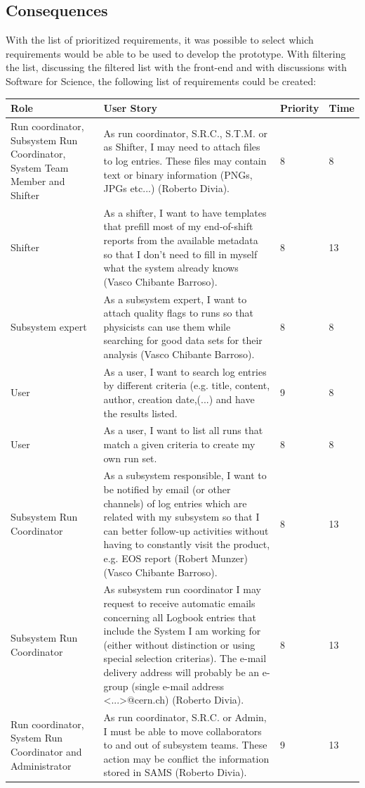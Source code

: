 \documentclass[paper=a4, fontsize=11pt,twoside]{scrartcl}	%
\begin{document}
\subsection{Consequences}
With the list of prioritized requirements, it was possible to select which requirements would be able to be used to develop the prototype. With filtering the list, discussing the filtered list with the front-end and with discussions with Software for Science, the following list of requirements could be created: \\
\begin{longtable}{ | p{3cm} | p{8cm} | p{1.5cm} | l |}
\hline
Role & User Story & Priority & Time \\ \hline
Run coordinator, Subsystem Run Coordinator, System Team Member and Shifter& As run coordinator, S.R.C., S.T.M. or as Shifter, I may need to attach files to log entries. These files may contain text or binary information (PNGs, JPGs etc...) (Roberto Divia). & 8 & 8 \\ \hline
Shifter &  As a shifter, I want to have templates that prefill most of my end-of-shift reports from the available metadata so that I don’t need to fill in myself what the system already knows (Vasco Chibante Barroso). & 8 & 13 \\ \hline
Subsystem expert & As a subsystem expert, I want to attach quality flags to runs so that
physicists can use them while searching for good data sets for their analysis (Vasco Chibante Barroso). & 8 & 8 \\ \hline
User & As a user, I want to search log entries by different criteria (e.g. title, content, author, creation date,(...) and have the results listed. & 9 & 8 \\ \hline
User &  As a user, I want to list all runs that match a given criteria to create my own run set. & 8 & 8 \\ \hline
Subsystem Run Coordinator &  As a subsystem responsible, I want to be notified by email (or other channels) of log entries which are related with my subsystem so that I can better follow-up activities without having to constantly visit the product, e.g. EOS report (Robert Munzer) (Vasco Chibante Barroso). & 8 & 13 \\ \hline
Subsystem Run Coordinator & As subsystem run coordinator I may request to receive automatic emails concerning all Logbook entries that include the System I am working for (either without distinction or using special selection criterias). The e-mail delivery address will probably be an e-group (single e-mail address <...>@cern.ch) (Roberto Divia). & 8 & 13 \\ \hline
Run coordinator, System Run Coordinator and Administrator &  As run coordinator, S.R.C. or Admin, I must be able to move collaborators to and out of subsystem teams. These action may be conflict the information stored in SAMS (Roberto Divia). & 9 & 13 \\ \hline
\end{longtable}
\end{document}
